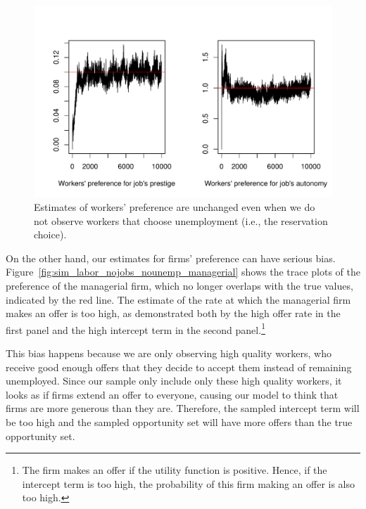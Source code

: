 \begin{figure}[tbp]
  \centering
  \includegraphics[width=\textwidth,keepaspectratio]{../figure/sim_labor_nojobs_nounemp_alpha}
  \caption[Estimates of workers' preference when the reservation choice is
  unobserved]{Estimates of workers' preference are unchanged even when we do not
    observe workers that choose unemployment (i.e., the reservation choice).}
  \label{fig:sim_labor_nojobs_nounemp_alpha}
\end{figure}

On the other hand, our estimates for firms' preference can have serious bias.
Figure~\ref{fig:sim_labor_nojobs_nounemp_managerial} shows the trace plots of
the preference of the managerial firm, which no longer overlaps with the true
values, indicated by the red line. The estimate of the rate at which the
managerial firm makes an offer is too high, as demonstrated both by the high
offer rate in the first panel and the high intercept term in the second
panel.\footnote{The firm makes an offer if the utility function is positive.
  Hence, if the intercept term is too high, the probability of this firm making
  an offer is also too high.}

This bias happens because we are only observing high quality workers, who
receive good enough offers that they decide to accept them instead of remaining
unemployed. Since our sample only include only these high quality workers, it
looks as if firms extend an offer to everyone, causing our model to think that
firms are more generous than they are. Therefore, the sampled intercept term
will be too high and the sampled opportunity set will have more offers than the
true opportunity set.

